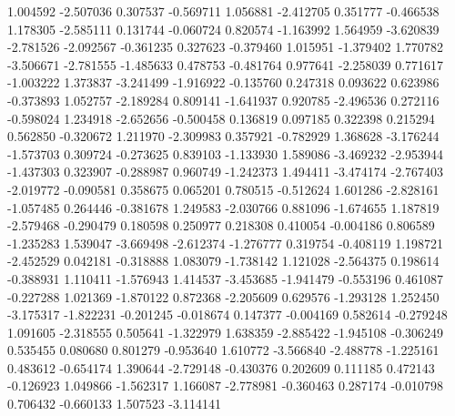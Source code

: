 1.004592
-2.507036
0.307537
-0.569711
1.056881
-2.412705
0.351777
-0.466538
1.178305
-2.585111
0.131744
-0.060724
0.820574
-1.163992
1.564959
-3.620839
-2.781526
-2.092567
-0.361235
0.327623
-0.379460
1.015951
-1.379402
1.770782
-3.506671
-2.781555
-1.485633
0.478753
-0.481764
0.977641
-2.258039
0.771617
-1.003222
1.373837
-3.241499
-1.916922
-0.135760
0.247318
0.093622
0.623986
-0.373893
1.052757
-2.189284
0.809141
-1.641937
0.920785
-2.496536
0.272116
-0.598024
1.234918
-2.652656
-0.500458
0.136819
0.097185
0.322398
0.215294
0.562850
-0.320672
1.211970
-2.309983
0.357921
-0.782929
1.368628
-3.176244
-1.573703
0.309724
-0.273625
0.839103
-1.133930
1.589086
-3.469232
-2.953944
-1.437303
0.323907
-0.288987
0.960749
-1.242373
1.494411
-3.474174
-2.767403
-2.019772
-0.090581
0.358675
0.065201
0.780515
-0.512624
1.601286
-2.828161
-1.057485
0.264446
-0.381678
1.249583
-2.030766
0.881096
-1.674655
1.187819
-2.579468
-0.290479
0.180598
0.250977
0.218308
0.410054
-0.004186
0.806589
-1.235283
1.539047
-3.669498
-2.612374
-1.276777
0.319754
-0.408119
1.198721
-2.452529
0.042181
-0.318888
1.083079
-1.738142
1.121028
-2.564375
0.198614
-0.388931
1.110411
-1.576943
1.414537
-3.453685
-1.941479
-0.553196
0.461087
-0.227288
1.021369
-1.870122
0.872368
-2.205609
0.629576
-1.293128
1.252450
-3.175317
-1.822231
-0.201245
-0.018674
0.147377
-0.004169
0.582614
-0.279248
1.091605
-2.318555
0.505641
-1.322979
1.638359
-2.885422
-1.945108
-0.306249
0.535455
0.080680
0.801279
-0.953640
1.610772
-3.566840
-2.488778
-1.225161
0.483612
-0.654174
1.390644
-2.729148
-0.430376
0.202609
0.111185
0.472143
-0.126923
1.049866
-1.562317
1.166087
-2.778981
-0.360463
0.287174
-0.010798
0.706432
-0.660133
1.507523
-3.114141
